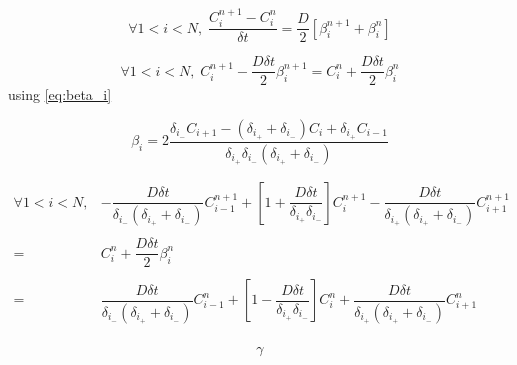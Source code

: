 \documentclass[aps,11pt]{revtex4}
\begin{document}
\begin{equation}
\forall 1<i<N, \; \dfrac{C_i^{n+1}-C_i^{n}}{\delta t} = \dfrac{D}{2} \left[ \beta_i^{n+1} + \beta_i^{n}\right]
\end{equation}

\begin{equation}
\forall 1<i<N, \;  C_i^{n+1} - \dfrac{D\delta t}{2} \beta_i^{n+1} = C_i^{n} +  \dfrac{D\delta t}{2} \beta_i^{n}
\end{equation}
using \eqref{eq:beta_i}

$$
		\beta_i = 2\dfrac{ \delta_{i_-} C_{i+1}  - (\delta_{i_+}+\delta_{i_-})C_i + \delta_{i_+} C_{i-1} }{ \delta_{i_+}\delta_{i_-}(\delta_{i_+}+\delta_{i_-})  }
$$

\begin{equation}
\begin{array}{rl}
\forall 1<i<N, &  
- \dfrac{D\delta t}{\delta_{i_-}(\delta_{i_+}+\delta_{i_-})} C_{i-1}^{n+1} + \left[1+\dfrac{D\delta t}{\delta_{i_+}\delta_{i_-}}\right] C_i^{n+1} - \dfrac{D\delta t}{\delta_{i_+}(\delta_{i_+}+\delta_{i_-})}C_{i+1}^{n+1}\\
\\
 = & C_i^{n} +  \dfrac{D\delta t}{2} \beta_i^{n}\\
 \\
 = & \dfrac{D\delta t}{\delta_{i_-}(\delta_{i_+}+\delta_{i_-})} C_{i-1}^{n} 
 +\left[1-\dfrac{D\delta t}{\delta_{i_+}\delta_{i_-}}\right] C_i^{n}
 +\dfrac{D\delta t}{\delta_{i_+}(\delta_{i_+}+\delta_{i_-})}C_{i+1}^{n}\\
 \end{array}
 \end{equation}

\begin{equation}
	\gamma
\end{equation}
\end{document}

